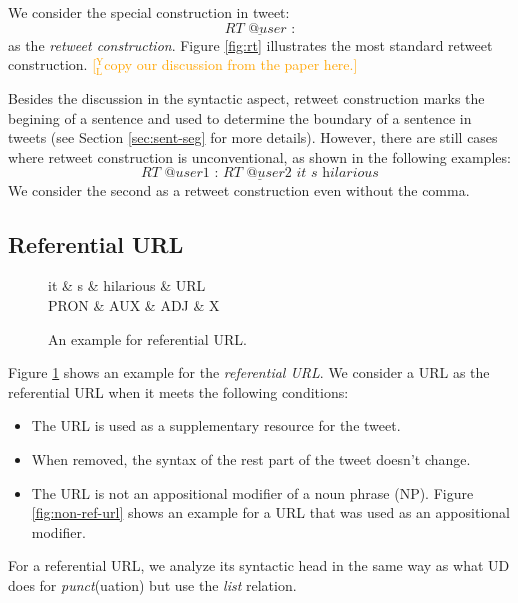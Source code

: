 \documentclass[11pt,a4paper]{article}
\newcommand{\yjcomment}[1]{\textcolor{orange}{[$_\mathrm{L}^\mathrm{Y}$#1]}}
\begin{document}
We consider the special construction in tweet: 
\[
\underline{\textit{RT @user :}}
\]
as the \textit{retweet construction}.
Figure \ref{fig:rt} illustrates the most standard retweet construction.
\yjcomment{copy our discussion from the paper here.}

Besides the discussion in the syntactic aspect, 
retweet construction marks the begining of a sentence and used to
determine the boundary of a sentence in tweets (see Section \ref{sec:sent-seg} for
more details).
However, there are still cases where retweet construction is unconventional, 
as shown in the following examples:
\[
\underline{\textit{RT @user1 : RT @user2 it s hilarious}}
\]
We consider the second as a retweet construction even without the comma.

\subsection{Referential URL}

\begin{figure}[t]
	\centering
	\small
	\begin{dependency}[edge slant=2, text only label, label style=above]
		\begin{deptext}
			it \& s \& hilarious \& URL \\
			PRON \& AUX \& ADJ \& X\\
		\end{deptext}
	\end{dependency}
	\caption{An example for referential URL.}\label{fig:ref-url}
\end{figure}

Figure \ref{fig:ref-url} shows an example for the \textit{referential URL}.
We consider a URL as the referential URL when it meets the following conditions:

\begin{itemize}
	\item The URL is used as a supplementary resource for the tweet.
	\item When removed, the syntax of the rest part of the tweet doesn't change.
	\item The URL is not an appositional modifier of a noun phrase (NP). 
	Figure \ref{fig:non-ref-url}
	shows an example for a URL that was used as an appositional modifier.
\end{itemize}

For a referential URL, we analyze its syntactic head in the same way as
what UD does for \textit{punct}(uation) but use the \textit{list}
relation.
\end{document}
